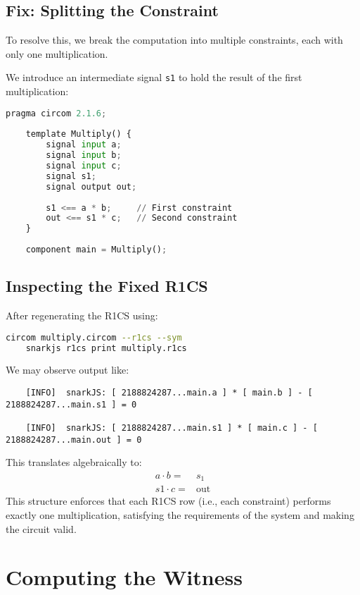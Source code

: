 \documentclass{article}
\begin{document}
\subsection*{Fix: Splitting the Constraint}

To resolve this, we break the computation into multiple constraints, each with only one multiplication.

We introduce an intermediate signal \texttt{s1} to hold the result of the first multiplication:

\begin{lstlisting}[language=Python,caption={Valid: One multiplication per constraint}]
	pragma circom 2.1.6;
	
	template Multiply() {
		signal input a;
		signal input b;
		signal input c;
		signal s1;
		signal output out;
		
		s1 <== a * b;     // First constraint
		out <== s1 * c;   // Second constraint
	}
	
	component main = Multiply();
\end{lstlisting}

\subsection*{Inspecting the Fixed R1CS}

After regenerating the R1CS using:

\begin{lstlisting}[language=bash]
	circom multiply.circom --r1cs --sym
	snarkjs r1cs print multiply.r1cs
\end{lstlisting}

We may observe output like:

\begin{verbatim}
	[INFO]  snarkJS: [ 2188824287...main.a ] * [ main.b ] - [ 2188824287...main.s1 ] = 0
	
	[INFO]  snarkJS: [ 2188824287...main.s1 ] * [ main.c ] - [ 2188824287...main.out ] = 0
\end{verbatim}

This translates algebraically to:
\begin{align*}
	a \cdot b  = &s_1\\
s1 \cdot c = &\text{out}
\end{align*}  
This structure enforces that each R1CS row (i.e., each constraint) performs exactly one multiplication, satisfying the requirements of the system and making the circuit valid.

\section{Computing the Witness}
\end{document}
